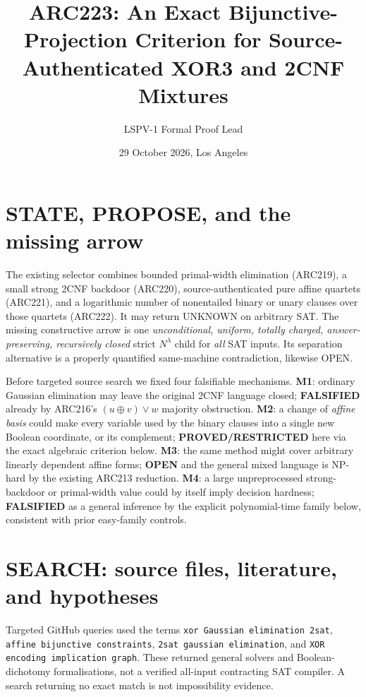 \documentclass[11pt]{article}
\title{ARC223: An Exact Bijunctive-Projection Criterion for Source-Authenticated XOR3 and 2CNF Mixtures}
\author{LSPV-1 Formal Proof Lead}
\date{29 October 2026, Los Angeles}
\begin{document}
\maketitle
\begin{center}
\end{center}

\section{STATE, PROPOSE, and the missing arrow}
The existing selector combines bounded primal-width elimination (ARC219), a small strong
2CNF backdoor (ARC220), source-authenticated pure affine quartets (ARC221), and a
logarithmic number of nonentailed binary or unary clauses over those quartets (ARC222).
It may return UNKNOWN on arbitrary SAT. The missing constructive arrow is one
\emph{unconditional, uniform, totally charged, answer-preserving, recursively closed}
strict $N^\lambda$ child for \emph{all} SAT inputs. Its separation alternative is a
properly quantified same-machine contradiction, likewise OPEN.

Before targeted source search we fixed four falsifiable mechanisms.
\textbf{M1}: ordinary Gaussian elimination may leave the original 2CNF language closed;
\textbf{FALSIFIED} already by ARC216's $(u\oplus v)\vee w$ majority obstruction.
\textbf{M2}: a change of \emph{affine basis} could make every variable used by the
binary clauses into a single new Boolean coordinate, or its complement;
\textbf{PROVED/RESTRICTED} here via the exact algebraic criterion below.
\textbf{M3}: the same method might cover arbitrary linearly dependent affine forms;
\textbf{OPEN} and the general mixed language is NP-hard by the existing ARC213 reduction.
\textbf{M4}: a large unpreprocessed strong-backdoor or primal-width value could by
itself imply decision hardness; \textbf{FALSIFIED} as a general inference by the
explicit polynomial-time family below, consistent with prior easy-family controls.

\section{SEARCH: source files, literature, and hypotheses}
Targeted GitHub queries used the terms
\texttt{xor Gaussian elimination 2sat}, \texttt{affine bijunctive constraints},
\texttt{2sat gaussian elimination}, and \texttt{XOR encoding implication graph}.
These returned general solvers and Boolean-dichotomy formalisations, not a
verified all-input contracting SAT compiler. A search returning no exact match
is not impossibility evidence.
\end{document}
